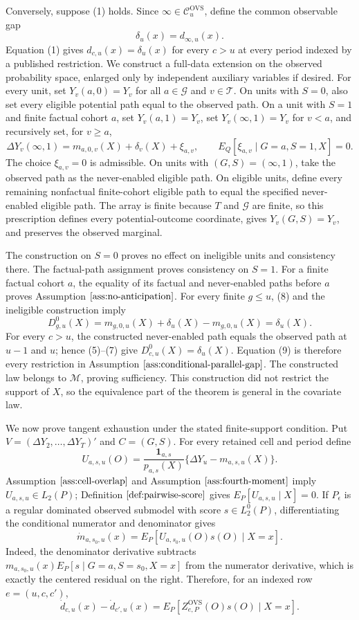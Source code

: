 Conversely, suppose (1) holds.  Since \(\infty\in\mathcal C_u^{\mathrm{OVS}}\), define the common observable gap
\[
\delta_u(x)=d_{\infty,u}(x).
\tag{7}
\]
Equation (1) gives \(d_{c,u}(x)=\delta_u(x)\) for every \(c>u\) at every period indexed by a published restriction.  We construct a full-data extension on the observed probability space, enlarged only by independent auxiliary variables if desired.  For every unit, set \(Y_v(a,0)=Y_v\) for all \(a\in\mathcal G\) and \(v\in\mathcal T\).  On units with \(S=0\), also set every eligible potential path equal to the observed path.  On a unit with \(S=1\) and finite factual cohort \(a\), set \(Y_v(a,1)=Y_v\), set \(Y_v(\infty,1)=Y_v\) for \(v<a\), and recursively set, for \(v\ge a\),
\[
\Delta Y_v(\infty,1)=m_{a,0,v}(X)+\delta_v(X)+\xi_{a,v},
\qquad
E_Q[\xi_{a,v}\mid G=a,S=1,X]=0.
\tag{8}
\]
The choice \(\xi_{a,v}=0\) is admissible.  On units with \((G,S)=(\infty,1)\), take the observed path as the never-enabled eligible path.  On eligible units, define every remaining nonfactual finite-cohort eligible path to equal the specified never-enabled eligible path.  The array is finite because \(T\) and \(\mathcal G\) are finite, so this prescription defines every potential-outcome coordinate, gives \(Y_v(G,S)=Y_v\), and preserves the observed marginal.

The construction on \(S=0\) proves no effect on ineligible units and consistency there.  The factual-path assignment proves consistency on \(S=1\).  For a finite factual cohort \(a\), the equality of its factual and never-enabled paths before \(a\) proves Assumption \(\ref{ass:no-anticipation}\).  For every finite \(g\le u\), (8) and the ineligible construction imply
\[
D^0_{g,u}(X)=m_{g,0,u}(X)+\delta_u(X)-m_{g,0,u}(X)=\delta_u(X).
\tag{9}
\]
For every \(c>u\), the constructed never-enabled path equals the observed path at \(u-1\) and \(u\); hence (5)--(7) give \(D^0_{c,u}(X)=\delta_u(X)\).  Equation (9) is therefore every restriction in Assumption \(\ref{ass:conditional-parallel-gap}\).  The constructed law belongs to \(\mathcal M\), proving sufficiency.  This construction did not restrict the support of \(X\), so the equivalence part of the theorem is general in the covariate law.

We now prove tangent exhaustion under the stated finite-support condition.  Put \(V=(\Delta Y_2,\ldots,\Delta Y_T)'\) and \(C=(G,S)\).  For every retained cell and period define
\[
U_{a,s,u}(O)=\frac{\mathbf 1_{a,s}}{p_{a,s}(X)}
\{\Delta Y_u-m_{a,s,u}(X)\}.
\tag{10}
\]
Assumption \(\ref{ass:cell-overlap}\) and Assumption \(\ref{ass:fourth-moment}\) imply \(U_{a,s,u}\in L_2(P)\); Definition \(\ref{def:pairwise-score}\) gives \(E_P[U_{a,s,u}\mid X]=0\).  If \(P_\epsilon\) is a regular dominated observed submodel with score \(s\in L_2^0(P)\), differentiating the conditional numerator and denominator gives
\[
\dot m_{a,s_0,u}(x)
=E_P[U_{a,s_0,u}(O)s(O)\mid X=x].
\tag{11}
\]
Indeed, the denominator derivative subtracts \(m_{a,s_0,u}(x)E_P[s\mid G=a,S=s_0,X=x]\) from the numerator derivative, which is exactly the centered residual on the right.  Therefore, for an indexed row \(e=(u,c,c')\),
\[
\dot d_{c,u}(x)-\dot d_{c',u}(x)
=E_P[Z^{\mathrm{OVS}}_{e,P}(O)s(O)\mid X=x].
\tag{12}
\]

